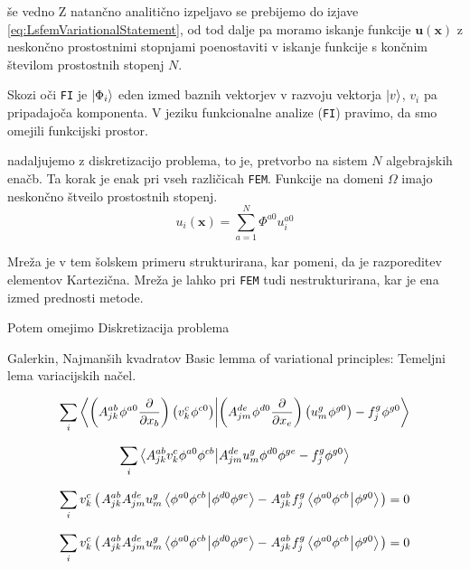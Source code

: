 še vedno  Z natančno analitično izpeljavo se prebijemo do izjave \eqref{eq:LsfemVariationalStatement}, od tod dalje pa moramo iskanje funkcije $\mathbf{u(x)}$ z neskončno prostostnimi stopnjami poenostaviti v iskanje funkcije s končnim številom prostostnih stopenj $N$. 

Skozi oči \texttt{FI} je $\ket{\Phi_i}$ eden izmed baznih vektorjev v razvoju vektorja $\ket{v}$, $v_i$ pa pripadajoča komponenta.
V jeziku funkcionalne analize (\texttt{FI}) pravimo, da smo omejili funkcijski prostor.

nadaljujemo z diskretizacijo problema, to je, pretvorbo na sistem $N$ algebrajskih enačb. Ta korak je enak pri vseh različicah \texttt{FEM}. Funkcije na domeni $\Omega$ imajo neskončno štveilo prostostnih stopenj. 
\begin{equation}
    u_i(\mathbf{x}) = \sum_{a = 1}^N \Phi^{a0} u^{a0}_i
\end{equation}

Mreža je v tem šolskem primeru strukturirana, kar pomeni, da je razporeditev elementov Kartezična. Mreža je lahko pri \texttt{FEM} tudi nestrukturirana, kar je ena izmed prednosti metode.

Potem omejimo Diskretizacija problema 

Galerkin, Najmanših kvadratov \cite{JiangB-LSFEM}
Basic lemma of variational principles: Temeljni lema variacijskih načel.


\begin{equation}
   \sum_i \bra{\left(A^{ab}_{jk} \mkern1mu \phi^{a0} \frac{\partial}{\partial x_b}\right) \left(v^c_k \mkern1mu \phi^{c0}\right)}\ket{\left(A^{de}_{jm} \mkern1mu \phi^{d0} \frac{\partial}{\partial x_e}\right) \left(u^g_m \mkern1mu \phi^{g0}\right) - f^g_j \mkern1mu \phi^{g0}}
\end{equation}

\begin{equation}
   \sum_i \bra{A^{ab}_{jk} v^c_k \phi^{a0} \phi^{cb}}\ket{A^{de}_{jm} u^g_m \phi^{d0} \phi^{ge} - f^g_j \phi^{g0}}
\end{equation}

\begin{equation}
   \sum_i v^c_k \left( \mkern2mu A^{ab}_{jk} A^{de}_{jm} u^g_m \bra{\phi^{a0} \phi^{cb} \mkern1mu}\ket{\mkern1mu \phi^{d0} \phi^{ge}} - \mkern1mu A^{ab}_{jk} \mkern1mu f^g_j \bra{\phi^{a0} \phi^{cb} \mkern1mu}\ket{\mkern1mu \phi^{g0}} \mkern2mu \right) = 0
\end{equation}

\begin{equation}
   \sum_i v^c_k \left( \mkern2mu A^{ab}_{jk} A^{de}_{jm} u^g_m \bra{\phi^{a0} \phi^{cb} \mkern1mu}\ket{\mkern1mu \phi^{d0} \phi^{ge}} - \mkern1mu A^{ab}_{jk} \mkern1mu f^g_j \bra{\phi^{a0} \phi^{cb} \mkern1mu}\ket{\mkern1mu \phi^{g0}} \mkern2mu \right) = 0
\end{equation}

